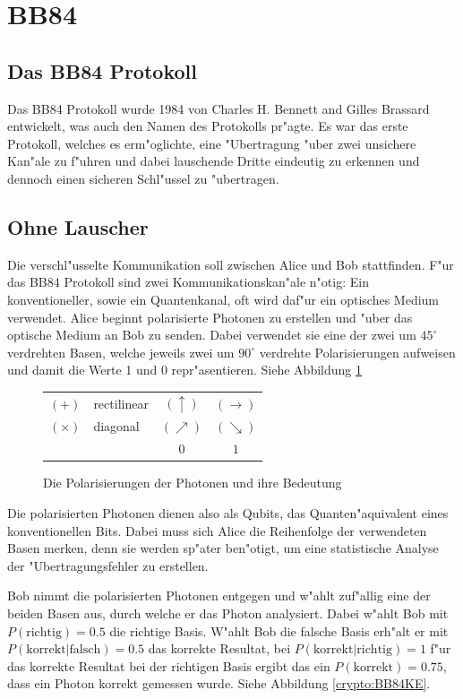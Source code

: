 \section{BB84}
  \subsection{Das BB84 Protokoll}
  Das BB84 Protokoll wurde 1984 von Charles H. Bennett and Gilles Brassard entwickelt,
  was auch den Namen des Protokolls pr"agte.
  Es war das erste Protokoll, welches es erm"oglichte, eine "Ubertragung "uber zwei unsichere Kan"ale zu f"uhren
  und dabei lauschende Dritte eindeutig zu erkennen und dennoch einen sicheren Schl"ussel zu "ubertragen.

  \subsection{Ohne Lauscher}
  Die verschl"usselte Kommunikation soll zwischen Alice und Bob stattfinden.
  F"ur das BB84 Protokoll sind zwei Kommunikationskan"ale n"otig:
  Ein konventioneller, sowie ein Quantenkanal, oft wird daf"ur ein optisches Medium verwendet.
  Alice beginnt polarisierte Photonen zu erstellen und "uber das optische Medium an Bob zu senden.
  Dabei verwendet sie eine der zwei um $45^{\circ}$ verdrehten Basen,
  welche jeweils zwei um $90^{\circ}$ verdrehte Polarisierungen aufweisen und damit die Werte 1 und 0 repr"asentieren. Siehe Abbildung \ref{crypto:poltab}

  \begin{figure}
    \centering
    \begin{tabular}{l l || c c}
      \hline
      $(+)$ & rectilinear & $(\uparrow)$ & $(\rightarrow)$\\
      $(\times)$ & diagonal & $(\nearrow)$ & $(\searrow)$\\
      \hline
      & & $0$ & $1$\\
      \hline
    \end{tabular}
    \caption{Die Polarisierungen der Photonen und ihre Bedeutung\label{crypto:poltab}}
  \end{figure}

  Die polarisierten Photonen dienen also als Qubits, das Quanten"aquivalent eines konventionellen Bits.
  Dabei muss sich Alice die Reihenfolge der verwendeten Basen merken,
  denn sie werden sp"ater ben"otigt, um eine statistische Analyse der "Ubertragungsfehler zu erstellen.

  Bob nimmt die polarisierten Photonen entgegen und w"ahlt zuf"allig eine der beiden Basen aus, durch welche er das Photon analysiert.
  Dabei w"ahlt Bob mit
  $P(\text{richtig})=0.5$
  die richtige Basis.
  W"ahlt Bob die falsche Basis erh"alt er mit
  $P(\text{korrekt}|\text{falsch})=0.5$
  das korrekte Resultat, bei
  $P(\text{korrekt}|\text{richtig})=1$
  f"ur das korrekte Resultat bei der richtigen Basis ergibt das ein
  $P(\text{korrekt})=0.75$,
  dass ein Photon korrekt gemessen wurde.
  Siehe Abbildung \ref{crypto:BB84KE}.

